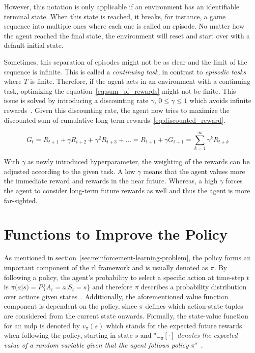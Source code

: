 \documentclass[draft,final]{vutinfth} %
\newcommand{\p}[1]{see p. #1}
\begin{document}
    However, this notation is only applicable if an environment has an identifiable terminal state.
    When this state is reached, it breaks, for instance, a game sequence into multiple ones where each one is called an episode.
    No matter how the agent reached the final state, the environment will reset and start over with a default initial state.

    Sometimes, this separation of episodes might not be as clear and the limit of the sequence is infinite.
    This is called a \textit{continuing task}, in contrast to \textit{episodic tasks} where $T$ is finite.
    Therefore, if the agent acts in an environment with a continuing task, optimizing the equation~\eqref{eq:sum_of_rewards} might not be finite.
    This issue is solved by introducing a discounting rate $\gamma$, $0 \leq \gamma \leq 1$ which avoids infinite rewards~\citep[\p{54f}]{sutton_reinforcement_2018}.
    Given this discounting rate, the agent now tries to maximize the discounted sum of cumulative long-term rewards~\eqref{eq:discounted_reward}.

    \begin{equation}
        G_t = R_{t+1} + \gamma R_{t+2}+ \gamma^2 R_{t+3} + \ldots = R_{t+1} + \gamma G_{t+1} = \sum_{k=1}^{\infty} \gamma^k R_{t+k}\label{eq:discounted_reward}
    \end{equation}

    With $\gamma$ as newly introduced hyperparameter, the weighting of the rewards can be adjusted according to the given task.
    A low $\gamma$ means that the agent values more the immediate reward and rewards in the near future.
    Whereas, a high $\gamma$ forces the agent to consider long-term future rewards as well and thus the agent is more far-sighted.


    \section{Functions to Improve the Policy}\label{sec:functions-to-improve-the-policy}
    As mentioned in section~\ref{sec:reinforcement-learning-problem}, the policy forms an important component of the \gls{rl} framework and is usually denoted as $\pi$.
    By following a policy, the agent's probability to select a specific action at time-step $t$ is $\pi(a|s) = P\{A_t=a|S_t=s\}$ and therefore $\pi$ describes a probability distribution over actions given states~.
    Additionally, the aforementioned value function component is dependent on the policy, since $\pi$ defines which action-state tuples are considered from the current state onwards.
    Formally, the state-value function for an \gls{mdp} is denoted by $v_\pi(s)$ which stands for the expected future rewards when following the policy, starting in state $s$ and "\textit{$\mathbb{E}_\pi[\cdot]$ denotes the expected value of a random variable given that the agent follows policy $\pi$}"~\citep[\p{58}]{sutton_reinforcement_2018}.
\end{document}
